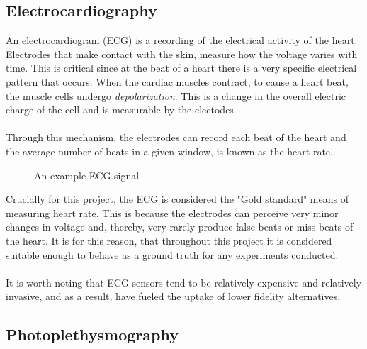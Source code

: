 \subsection{Electrocardiography}
An electrocardiogram (ECG) is a recording of the electrical activity of the heart. Electrodes that make contact with the skin, measure how the voltage varies with time.
This is critical since at the beat of a heart there is a very specific electrical pattern that occurs. When the cardiac muscles contract, to cause a heart beat, the muscle cells undergo
\textit{depolarization}. This is a change in the overall electric charge of the cell and is measurable by the electodes. \\\\
Through this mechanism, the electrodes can record each beat of the heart and the average number of beats in a given window, is known as the heart rate.
\begin{figure}[H]
    \centering
    
   \caption{An example ECG signal} 
\end{figure}
\noindent
Crucially for this project, the ECG is considered the "Gold standard" means of measuring heart rate. This is because the electrodes can perceive very minor changes in voltage and, thereby, very rarely produce false beats or miss beats of the heart. It is for this reason, that throughout this project it is considered suitable enough to behave as a ground truth for any experiments conducted.
\\\\
It is worth noting that ECG sensors tend to be relatively expensive and relatively invasive, and as a result, have fueled the uptake of lower fidelity alternatives.

\subsection{Photoplethysmography}

